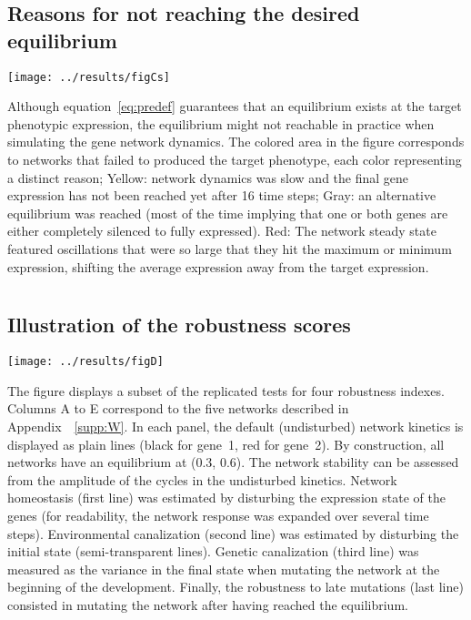 \documentclass[10pt,a4paper]{article}
\newcommand{\SupMat}{Appendix~}
\begin{document}
\begin{appendices}
    \subsection*{Reasons for not reaching the desired equilibrium}
	\begin{center}
	\texttt{[image: ../results/figCs]}
	\end{center}
	
	{\color{Gray} Although equation~\ref{eq:predef} guarantees that an equilibrium exists at the target phenotypic expression, the equilibrium might not reachable in practice when simulating the gene network dynamics. The colored area in the figure corresponds to networks that failed to produced the target phenotype, each color representing a distinct reason; Yellow: network dynamics was slow and the final gene expression has not been reached yet after 16 time steps; Gray: an alternative equilibrium was reached (most of the time implying that one or both genes are either completely silenced to fully expressed). Red: The network steady state featured oscillations that were so large that they hit the maximum or minimum expression, shifting the average expression away from the target expression. }

  \clearpage


  \clearpage
  \section{}
    \label{supp:simpanels}
    \subsection*{Illustration of the robustness scores}

	\begin{adjustwidth}{-1in}{0in}
	\begin{flushright}
	\texttt{[image: ../results/figD]}
	\end{flushright}
	\color{Gray} The figure displays a subset of the replicated tests for four robustness indexes. Columns A to E correspond to the five networks described in \SupMat~\ref{supp:W}. In each panel, the default (undisturbed) network kinetics is displayed as plain lines (black for gene~1, red for gene~2). By construction, all networks have an equilibrium at (0.3, 0.6). The network stability can be assessed from the amplitude of the cycles in the undisturbed kinetics. Network homeostasis (first line) was estimated by disturbing the expression state of the genes (for readability, the network response was expanded over several time steps). Environmental canalization (second line) was estimated by disturbing the initial state (semi-transparent lines). Genetic canalization (third line) was measured as the variance in the final state when mutating the network at the beginning of the development. Finally, the robustness to late mutations (last line) consisted in mutating the network after having reached the equilibrium.
	\end{adjustwidth}


\end{appendices}
\end{document}
